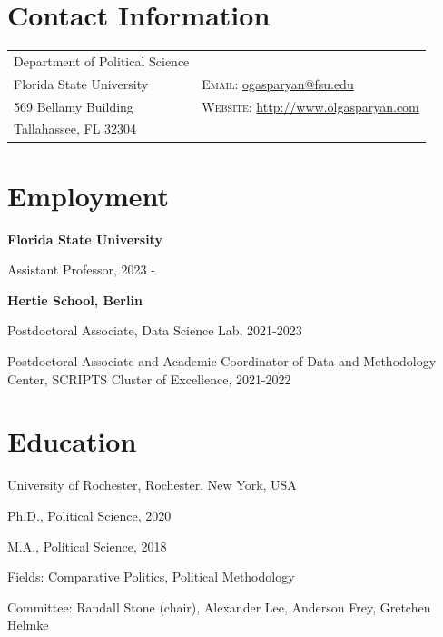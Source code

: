 \documentclass[margin,line,10.95pt]{res}
\newenvironment{list1}{
  \begin{list}{\ding{113}}{%
      \setlength{\itemsep}{0in}
      \setlength{\parsep}{0in} \setlength{\parskip}{0in}
      \setlength{\topsep}{0in} \setlength{\partopsep}{0in}
      \setlength{\leftmargin}{0.17in}}}{\end{list}}
\begin{document}

\begin{resume}
\section{\sc Contact Information}
\vspace{.05in}
\begin{tabular}{@{}p{2.5in}p{4in}}
Department of Political Science            &  \\
Florida State University  & \textsc{Email}: \href{mailto:ogasparyan@fsu.edu}{ogasparyan@fsu.edu} \\
569 Bellamy Building & \textsc{Website}: \href{http://www.olgasparyan.com}{http://www.olgasparyan.com} \\
Tallahassee, FL 32304     \\
\end{tabular}

\section{\sc Employment}
{\textbf{Florida State University}}\\
\vspace*{-.1in}
\begin{list1}
	\item[] Assistant Professor, 2023 -

\end{list1}


\textbf{Hertie School, Berlin}\\
\vspace*{-.1in}
\begin{list1}
	\item[] Postdoctoral Associate, Data Science Lab, 2021-2023 
	\item[] Postdoctoral Associate and Academic Coordinator of Data and Methodology Center, SCRIPTS Cluster of Excellence, 2021-2022

\end{list1}

\section{\sc Education}
{University of Rochester}, Rochester, New York, USA\\
\vspace*{-.1in}
\begin{list1}
\item[] Ph.D., Political Science, 2020 
\item[] M.A., Political Science, 2018 
\item[] Fields: Comparative Politics, Political Methodology 
\item[] Committee: Randall Stone (chair), Alexander Lee, Anderson Frey, Gretchen Helmke
\end{list1}


\end{resume}
\end{document}
